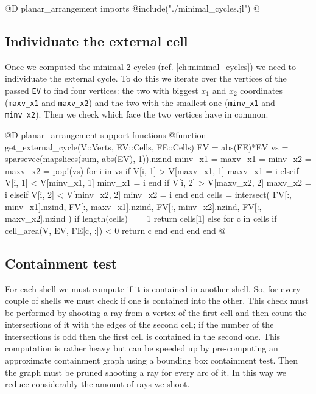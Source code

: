 \documentclass[10pt]{book}
\begin{document}
@D planar\_arrangement imports
@{include("./minimal_cycles.jl")
@}

\subsection{Individuate the external cell}
Once we computed the minimal 2-cycles (ref. \ref{ch:minimal_cycles})
we need to individuate the external cycle. To do this we iterate over the
vertices of the passed \texttt{EV} to find four vertices: the two with biggest
$x_1$ and $x_2$ coordinates (\texttt{maxv\_x1} and \texttt{maxv\_x2}) and the 
two with the smallest one (\texttt{minv\_x1} and \texttt{minv\_x2}). 
Then we check which face the two vertices have in common.

@D planar\_arrangement support functions
@{function get_external_cycle(V::Verts, EV::Cells, FE::Cells)
    FV = abs(FE)*EV
    vs = sparsevec(mapslices(sum, abs(EV), 1)).nzind
    minv_x1 = maxv_x1 = minv_x2 = maxv_x2 = pop!(vs)
    for i in vs
        if V[i, 1] > V[maxv_x1, 1]
            maxv_x1 = i
        elseif V[i, 1] < V[minv_x1, 1]
            minv_x1 = i
        end
        if V[i, 2] > V[maxv_x2, 2]
            maxv_x2 = i
        elseif V[i, 2] < V[minv_x2, 2]
            minv_x2 = i
        end
    end
    cells = intersect(
        FV[:, minv_x1].nzind, 
        FV[:, maxv_x1].nzind,
        FV[:, minv_x2].nzind,
        FV[:, maxv_x2].nzind
    )
    if length(cells) == 1
        return cells[1]
    else
        for c in cells
            if cell_area(V, EV, FE[c, :]) < 0
                return c
            end
        end
    end
end
@}

\subsection{Containment test}

For each shell we must compute if it is contained
in another shell. So, for every couple of shells
we must check if one is contained into the other.
This check must be performed by shooting a ray from
a vertex of the first cell and then count the intersections
of it with the edges of the second cell; if the number 
of the intersections is odd then the first cell is contained
in the second one. This computation is rather heavy but can be
speeded up by pre-computing an approximate containment graph 
using a bounding box containment test. Then the graph must be
pruned shooting a ray for every arc of it. In this way we reduce
considerably the amount of rays we shoot.
\end{document}
